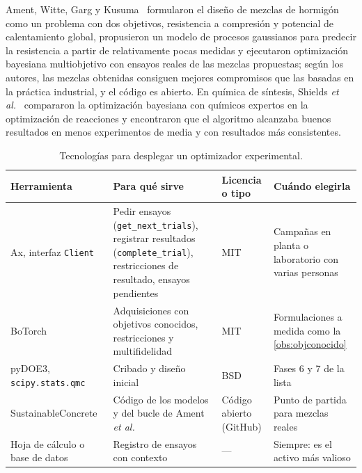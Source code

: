 \begin{ejemplo}\label{ej:reales}
Ament, Witte, Garg y Kusuma~\cite{ament} formularon el diseño de mezclas de hormigón como un problema con dos objetivos, resistencia a compresión y potencial de calentamiento global, propusieron un modelo de procesos gaussianos para predecir la resistencia a partir de relativamente pocas medidas y ejecutaron optimización bayesiana multiobjetivo con ensayos reales de las mezclas propuestas; según los autores, las mezclas obtenidas consiguen mejores compromisos que las basadas en la práctica industrial, y el código es abierto. En química de síntesis, Shields \emph{et al.}~\cite{shields} compararon la optimización bayesiana con químicos expertos en la optimización de reacciones y encontraron que el algoritmo alcanzaba buenos resultados en menos experimentos de media y con resultados más consistentes.
\end{ejemplo}

\begin{table}[ht]
\centering\small
\begin{tabularx}{\textwidth}{@{}>{\raggedright\arraybackslash}p{2.8cm}>{\raggedright\arraybackslash}X>{\raggedright\arraybackslash}p{2.2cm}>{\raggedright\arraybackslash}p{3.3cm}@{}}
\toprule
Herramienta & Para qué sirve & Licencia o tipo & Cuándo elegirla \\
\midrule
Ax, interfaz \texttt{Client}~\cite{ax} & Pedir ensayos (\texttt{get\_next\_trials}), registrar resultados (\texttt{complete\_trial}), restricciones de resultado, ensayos pendientes & MIT & Campañas en planta o laboratorio con varias personas \\
BoTorch~\cite{botorch} & Adquisiciones con objetivos conocidos, restricciones y multifidelidad & MIT & Formulaciones a medida como la \cref{obs:objconocido} \\
pyDOE3, \texttt{scipy.stats.qmc} & Cribado y diseño inicial & BSD & Fases 6 y 7 de la lista \\
Sustainable\-Concrete~\cite{ament} & Código de los modelos y del bucle de Ament \emph{et al.} & Código abierto (GitHub) & Punto de partida para mezclas reales \\
Hoja de cálculo o base de datos & Registro de ensayos con contexto & — & Siempre: es el activo más valioso \\
\bottomrule
\end{tabularx}
\caption{Tecnologías para desplegar un optimizador experimental.}
\label{tab:tec5}
\end{table}

